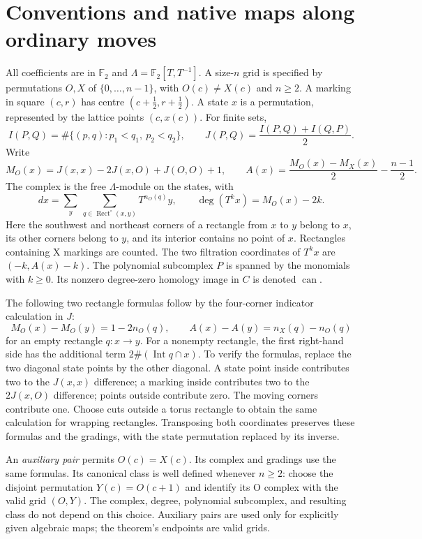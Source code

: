 \documentclass[11pt,a4paper]{article}
\theoremstyle{remark}
\begin{document}
\section{Conventions and native maps along ordinary moves}
\label{sec:conventions}

All coefficients are in $\mathbb F_2$ and
$\Lambda=\mathbb F_2[T,T^{-1}]$.  A size-$n$ grid is specified by
permutations $O,X$ of $\{0,\ldots,n-1\}$, with
$O(c)\ne X(c)$ and $n\ge2$.  A marking in square $(c,r)$ has centre
$(c+\tfrac12,r+\tfrac12)$.  A state $x$ is a permutation, represented
by the lattice points $(c,x(c))$.  For finite sets,
\[
 I(P,Q)=\#\{(p,q):p_1<q_1,\ p_2<q_2\},\qquad
 J(P,Q)=\frac{I(P,Q)+I(Q,P)}2.
\]
Write
\[
 M_O(x)=J(x,x)-2J(x,O)+J(O,O)+1,\qquad
 A(x)=\frac{M_O(x)-M_X(x)}2-\frac{n-1}2 .
\]
The complex is the free $\Lambda$-module on the states, with
\[
 d x=\sum_y\ \sum_{q\in\operatorname{Rect}^{\circ}(x,y)}
            T^{n_O(q)}y,\qquad
 \deg(T^kx)=M_O(x)-2k.
\]
Here the southwest and northeast corners of a rectangle from $x$
to $y$ belong to $x$, its other corners belong to $y$, and its
interior contains no point of $x$.  Rectangles containing X markings
are counted.  The two filtration coordinates of $T^kx$ are
$(-k,A(x)-k)$.  The polynomial subcomplex $P$ is spanned by the
monomials with $k\ge0$.  Its nonzero degree-zero homology image in
$C$ is denoted $\operatorname{can}$.

The following two rectangle formulas follow by the four-corner
indicator calculation in $J$:
\begin{equation}\label{eq:rectangle-gradings}
 M_O(x)-M_O(y)=1-2n_O(q),\qquad
 A(x)-A(y)=n_X(q)-n_O(q)
\end{equation}
for an empty rectangle $q:x\to y$.  For a nonempty rectangle, the
first right-hand side has the additional term
$2\#(\operatorname{Int}q\cap x)$.  To verify the formulas, replace
the two diagonal state points by the other diagonal.  A state point
inside contributes two to the $J(x,x)$ difference; a marking inside
contributes two to the $2J(x,O)$ difference; points outside contribute
zero.  The moving corners contribute one.  Choose cuts outside a
torus rectangle to obtain the same calculation for wrapping
rectangles.  Transposing both coordinates preserves these formulas
and the gradings, with the state permutation replaced by its inverse.

An \emph{auxiliary pair} permits $O(c)=X(c)$.  Its complex and
gradings use the same formulas.  Its canonical class is well defined
whenever $n\ge2$: choose the disjoint permutation $Y(c)=O(c+1)$ and
identify its O complex with the valid grid $(O,Y)$.  The complex,
degree, polynomial subcomplex, and resulting class do not depend
on this choice.  Auxiliary pairs are used only for explicitly given
algebraic maps; the theorem's endpoints are valid grids.
\end{document}
